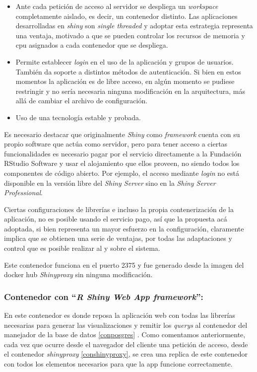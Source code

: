 \documentclass[
  10,
  openany]{book}
\begin{document}
\begin{itemize}
\item
  Ante cada petición de acceso al servidor se despliega un \emph{workspace} completamente aislado, es decir, un contenedor distinto. Las aplicaciones desarrolladas en \emph{shiny} son \emph{single threaded} y adoptar esta estrategia representa una ventaja, motivado a que se pueden controlar los recursos de memoria y cpu asignados a cada contenedor que se despliega.
\item
  Permite establecer \emph{login} en el uso de la aplicación y grupos de usuarios. También da soporte a distintos métodos de autenticación. Si bien en estos momentos la aplicación es de libre acceso, en algún momento se pudiese restringir y no sería necesaria ninguna modificación en la arquitectura, más allá de cambiar el archivo de configuración.
\item
  Uso de una tecnología estable y probada.
\end{itemize}

Es necesario destacar que originalmente \emph{Shiny} como \emph{framework} cuenta con su propio software que actúa como servidor, pero para tener acceso a ciertas funcionalidades es necesario pagar por el servicio directamente a la Fundación RStudio Software y usar el alojamiento que ellos proveen, no siendo todos los componentes de código abierto. Por ejemplo, el acceso mediante \emph{login} no está disponible en la versión libre del \emph{Shiny Server} sino en la \emph{Shiny Server Professional}.

Ciertas configuraciones de librerías e incluso la propia contenerización de la aplicación, no es posible usando el servicio pago, así que la propuesta acá adoptada, si bien representa un mayor esfuerzo en la configuración, claramente implica que se obtienen una serie de ventajas, por todas las adaptaciones y control que es posible realizar al y sobre el sistema.

Este contenedor funciona en el puerto 2375 y fue generado desde la imagen del docker hub \emph{Shinyproxy} sin ninguna modificación.

\hypertarget{conshiny}{%
\subsubsection{\texorpdfstring{Contenedor con ``\emph{R Shiny Web App framework}'':}{Contenedor con ``R Shiny Web App framework'':}}\label{conshiny}}

En este contenedor es donde reposa la aplicación web con todas las librerías necesarias para generar las visualizaciones y remitir los \emph{querys} al contenedor del manejador de la base de datos \ref{conposgres} . Como comentamos anteriormente, cada vez que ocurre desde el navegador del cliente una petición de acceso, desde el contenedor \emph{shinyproxy} \ref{conshinyproxy}, se crea una replica de este contenedor con todos los elementos necesarios para que la app funcione correctamente.
\end{document}
